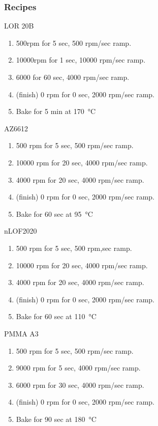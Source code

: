 \subsubsection{Recipes}
\begin{description}
\item {LOR 20B}
  \begin{enumerate}
  \item 500rpm for 5 sec, 500 rpm/sec ramp.
  \item 10000rpm for 1 sec, 10000 rpm/sec ramp.
  \item 6000 for 60 sec, 4000 rpm/sec ramp.
  \item (finish) 0 rpm for 0 sec, 2000 rpm/sec ramp.
  \item Bake for 5 min at \SI{170}{\celsius}
  \end{enumerate}
\item {AZ6612}
  \begin{enumerate}
  \item 500 rpm for 5 sec, 500 rpm/sec ramp.
  \item 10000 rpm for 20 sec, 4000 rpm/sec ramp.
  \item 4000 rpm for 20 sec, 4000 rpm/sec ramp.
  \item (finish) 0 rpm for 0 sec, 2000 rpm/sec ramp.
  \item Bake for 60 sec at \SI{95}{\celsius}
  \end{enumerate}
\item {nLOF2020}
  \begin{enumerate}
  \item 500 rpm for 5 sec, 500 rpm,sec ramp.
  \item 10000 rpm for 20 sec, 4000 rpm/sec ramp.
  \item 4000 rpm for 20 sec, 4000 rpm/sec ramp.
  \item (finish) 0 rpm for 0 sec, 2000 rpm/sec ramp.
  \item Bake for 60 sec at \SI{110}{\celsius}
  \end{enumerate}
\item {PMMA A3}
  \begin{enumerate}
  \item 500 rpm for 5 sec, 500 rpm/sec ramp.
  \item 9000 rpm for 5 sec, 4000 rpm/sec ramp.
  \item 6000 rpm for 30 sec, 4000 rpm/sec ramp.
  \item (finish) 0 rpm for 0 sec, 2000 rpm/sec ramp.
  \item Bake for 90 sec at \SI{180}{\celsius}

\end{enumerate}
\end{description}
